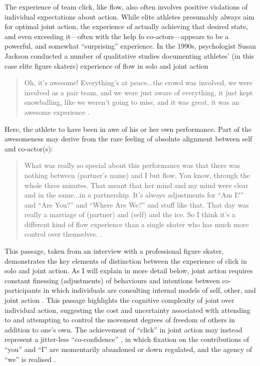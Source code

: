 \begin{CJK}{UTF8}{gbsn}
  The experience of team click, like flow, also often involves positive violations of individual expectations about action.  While elite athletes presumably always aim for optimal joint action, the experience of actually achieving that desired state, and even exceeding it---often with the help fo co-actors---appears to be a powerful, and somewhat ``surprising'' experience.  In the 1990s, psychologist Susan Jackson conducted a number of qualitative studies documenting athletes' (in this case elite figure skaters) experience of flow in solo and joint action

    \begin{quote}
      Oh, it's awesome! Everything's at peace...the crowd was involved, we were involved as a pair team, and we were just aware of everything, it just kept snowballing, like we weren’t going to miss, and it was great, it was an awesome experience \citep[168]{Jackson1992}.
    \end{quote}

Here, the athlete to have been in awe of his or her own performance.  Part of the awesomeness may derive from the rare feeling of absolute alignment between self and co-actor(s):

    \begin{quote}
      What was really so special about this performance was that there was nothing between (partner's name) and I but flow.  You know, through the whole three minutes.  That meant that her mind and my mind were clear and in the same...in a partnership. It's always adjustments for ``Am I?'' and ``Are You?'' and ``Where Are We?'' and stuff like that.  That day was really a marriage of (partner) and (self) and the ice.  So I think it's a different kind of flow experience than a single skater who has much more control over themselves. \citep[173-4]{Jackson1992}.
    \end{quote}

This passage, taken from an interview with a professional figure skater, demonstrates the key elements of distinction between the experience of click in solo and joint action. As I will explain in more detail below, joint action requires constant finessing (adjustments) of behaviours and intentions between co-participants in which individuals are consulting internal models of self, other, and joint action \citep{Pesquita2017}.  This passage highlights the cognitive complexity of joint over individual action, suggesting the cost and uncertainty associated with attending to and attempting to control the movement degrees of freedom of others in addition to one's own.  The achievement of ``click'' in joint action may instead represent a jitter-less ``co-confidence'' \citep{Noy2015,Noy2017}, in which fixation on the contributions of ``you'' and ``I'' are momentarily abandoned or down regulated, and the agency of ``we'' is realised \citep{Gallotti2013,Friston2015}.


\end{CJK}

